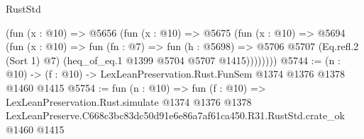 \begin{lexlean}{RustStd}
\begin{coremodule}
          (fun (x : @10) =>
          @5656
            (fun (x : @10) =>
            @5675
              (fun (x : @10) =>
              @5694
                (fun (x : @10) =>
                fun (fn : @7) =>
                fun (h : @5698) =>
                @5706 @5707 (Eq.refl.{2} (Sort 1) @7) (heq_of_eq.{1} @1399 @5704 @5707 @1415))))))))
@5744 := (n : @10) -> (f : @10) -> LexLeanPreservation.Rust.FunSem @1374 @1376 @1378 @1460 @1415
@5754 := fun (n : @10) =>
  fun (f : @10) =>
  LexLeanPreservation.Rust.simulate
    @1374
    @1376
    @1378
    LexLeanPreserve.C668c3bc83dc50d91e6e86a7af61ca450.R31.RustStd.crate_ok
    @1460
    @1415
\end{coremodule}
\end{lexlean}
